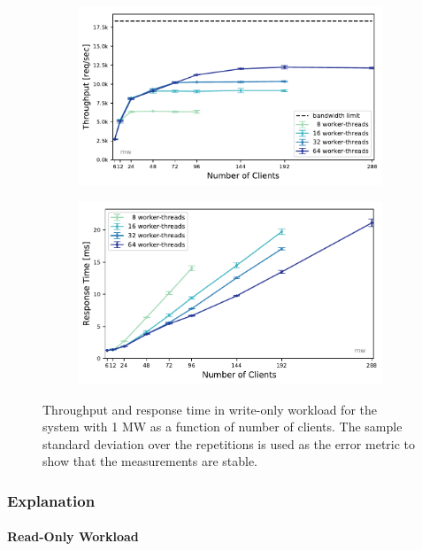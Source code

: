 \documentclass[report.tex]{subfiles}
\begin{document}
\begin{figure}[H]
	\begin{subfigure}[b]{.499\linewidth}
		\centering
		\includegraphics[width=\linewidth]{data/exp31_wo_tp_nc_w.pdf}
	\end{subfigure}\hfill
	\begin{subfigure}[b]{.499\linewidth}
		\centering
		\includegraphics[width=\linewidth]{data/exp31_wo_rt_nc_w.pdf}
	\end{subfigure}
\caption{Throughput and response time in write-only workload for the system with 1 MW as a function of number of clients. The sample standard deviation over the repetitions is used as the error metric to show that the measurements are stable.}\label{exp31_wo_tp_nc}
\end{figure}

\subsubsection{Explanation}

\paragraph{Read-Only Workload}
\end{document}
